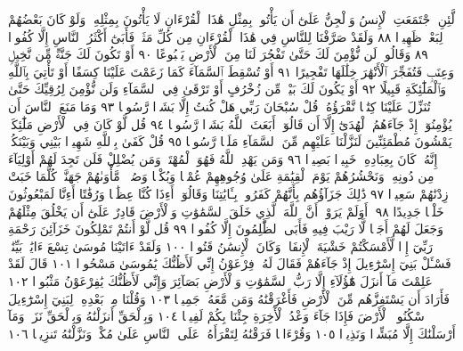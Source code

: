 لَّئِنِ ٱجْتَمَعَتِ ٱلْإِنسُ وَٱلْجِنُّ عَلَىٰٓ أَن يَأْتُوا۟ بِمِثْلِ هَٰذَا ٱلْقُرْءَانِ
لَا يَأْتُونَ بِمِثْلِهِۦ وَلَوْ كَانَ بَعْضُهُمْ لِبَعْضࣲ ظَهِيرࣰا ٨٨
وَلَقَدْ صَرَّفْنَا لِلنَّاسِ فِي هَٰذَا ٱلْقُرْءَانِ مِن كُلِّ مَثَلࣲ فَأَبَىٰٓ أَكْثَرُ
ٱلنَّاسِ إِلَّا كُفُورࣰا ٨٩ وَقَالُوا۟ لَن نُّؤْمِنَ لَكَ حَتَّىٰ تَفْجُرَ
لَنَا مِنَ ٱلْأَرْضِ يَنۢبُوعًا ٩٠ أَوْ تَكُونَ لَكَ جَنَّةࣱ مِّن نَّخِيلࣲ
وَعِنَبࣲ فَتُفَجِّرَ ٱلْأَنْهَٰرَ خِلَٰلَهَا تَفْجِيرًا ٩١ أَوْ تُسْقِطَ ٱلسَّمَآءَ
كَمَا زَعَمْتَ عَلَيْنَا كِسَفًا أَوْ تَأْتِيَ بِٱللَّهِ وَٱلْمَلَٰٓئِكَةِ
قَبِيلًا ٩٢ أَوْ يَكُونَ لَكَ بَيْتࣱ مِّن زُخْرُفٍ أَوْ تَرْقَىٰ فِي ٱلسَّمَآءِ
وَلَن نُّؤْمِنَ لِرُقِيِّكَ حَتَّىٰ تُنَزِّلَ عَلَيْنَا كِتَٰبࣰا نَّقْرَؤُهُۥۗ قُلْ
سُبْحَانَ رَبِّي هَلْ كُنتُ إِلَّا بَشَرࣰا رَّسُولࣰا ٩٣ وَمَا مَنَعَ ٱلنَّاسَ
أَن يُؤْمِنُوٓا۟ إِذْ جَآءَهُمُ ٱلْهُدَىٰٓ إِلَّآ أَن قَالُوٓا۟ أَبَعَثَ ٱللَّهُ بَشَرࣰا
رَّسُولࣰا ٩٤ قُل لَّوْ كَانَ فِي ٱلْأَرْضِ مَلَٰٓئِكَةࣱ يَمْشُونَ مُطْمَئِنِّينَ
لَنَزَّلْنَا عَلَيْهِم مِّنَ ٱلسَّمَآءِ مَلَكࣰا رَّسُولࣰا ٩٥ قُلْ كَفَىٰ بِٱللَّهِ
شَهِيدَۢا بَيْنِي وَبَيْنَكُمْۚ إِنَّهُۥ كَانَ بِعِبَادِهِۦ خَبِيرَۢا بَصِيرࣰا ٩٦
وَمَن يَهْدِ ٱللَّهُ فَهُوَ ٱلْمُهْتَدِۖ وَمَن يُضْلِلْ فَلَن تَجِدَ لَهُمْ أَوْلِيَآءَ
مِن دُونِهِۦۖ وَنَحْشُرُهُمْ يَوْمَ ٱلْقِيَٰمَةِ عَلَىٰ وُجُوهِهِمْ عُمْيࣰا وَبُكْمࣰا
وَصُمࣰّاۖ مَّأْوَىٰهُمْ جَهَنَّمُۖ كُلَّمَا خَبَتْ زِدْنَٰهُمْ سَعِيرࣰا ٩٧
ذَٰلِكَ جَزَآؤُهُم بِأَنَّهُمْ كَفَرُوا۟ بِـَٔايَٰتِنَا وَقَالُوٓا۟ أَءِذَا كُنَّا عِظَٰمࣰا
وَرُفَٰتًا أَءِنَّا لَمَبْعُوثُونَ خَلْقࣰا جَدِيدًا ٩٨۞ أَوَلَمْ يَرَوْا۟ أَنَّ ٱللَّهَ
ٱلَّذِي خَلَقَ ٱلسَّمَٰوَٰتِ وَٱلْأَرْضَ قَادِرٌ عَلَىٰٓ أَن يَخْلُقَ مِثْلَهُمْ
وَجَعَلَ لَهُمْ أَجَلࣰا لَّا رَيْبَ فِيهِ فَأَبَى ٱلظَّٰلِمُونَ إِلَّا كُفُورࣰا ٩٩
قُل لَّوْ أَنتُمْ تَمْلِكُونَ خَزَآئِنَ رَحْمَةِ رَبِّيٓ إِذࣰا لَّأَمْسَكْتُمْ خَشْيَةَ
ٱلْإِنفَاقِۚ وَكَانَ ٱلْإِنسَٰنُ قَتُورࣰا ١٠٠ وَلَقَدْ ءَاتَيْنَا مُوسَىٰ تِسْعَ
ءَايَٰتِۭ بَيِّنَٰتࣲۖ فَسْـَٔلْ بَنِيٓ إِسْرَٰٓءِيلَ إِذْ جَآءَهُمْ فَقَالَ لَهُۥ فِرْعَوْنُ
إِنِّي لَأَظُنُّكَ يَٰمُوسَىٰ مَسْحُورࣰا ١٠١ قَالَ لَقَدْ عَلِمْتَ مَآ أَنزَلَ
هَٰٓؤُلَآءِ إِلَّا رَبُّ ٱلسَّمَٰوَٰتِ وَٱلْأَرْضِ بَصَآئِرَ وَإِنِّي لَأَظُنُّكَ
يَٰفِرْعَوْنُ مَثْبُورࣰا ١٠٢ فَأَرَادَ أَن يَسْتَفِزَّهُم مِّنَ ٱلْأَرْضِ
فَأَغْرَقْنَٰهُ وَمَن مَّعَهُۥ جَمِيعࣰا ١٠٣ وَقُلْنَا مِنۢ بَعْدِهِۦ لِبَنِيٓ إِسْرَٰٓءِيلَ
ٱسْكُنُوا۟ ٱلْأَرْضَ فَإِذَا جَآءَ وَعْدُ ٱلْأٓخِرَةِ جِئْنَا بِكُمْ لَفِيفࣰا ١٠٤
وَبِٱلْحَقِّ أَنزَلْنَٰهُ وَبِٱلْحَقِّ نَزَلَۗ وَمَآ أَرْسَلْنَٰكَ إِلَّا مُبَشِّرࣰا وَنَذِيرࣰا ١٠٥
وَقُرْءَانࣰا فَرَقْنَٰهُ لِتَقْرَأَهُۥ عَلَى ٱلنَّاسِ عَلَىٰ مُكْثࣲ وَنَزَّلْنَٰهُ تَنزِيلࣰا ١٠٦

